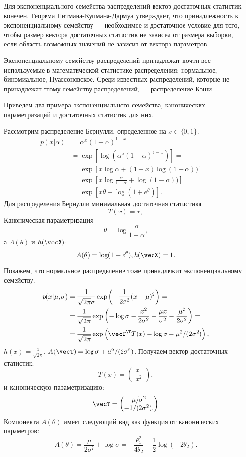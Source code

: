 Для экспоненциального семейства распределений вектор достаточных статистик конечен. Теорема Питмана-Купмана-Дармуа утверждает, что принадлежность к экспоненциальному семейству --- необходимое и достаточное условие для того, чтобы размер вектора достаточных статистик не зависел от размера выборки, если область возможных значений не зависит от вектора параметров.

Экспоненциальному семейству распределений принадлежат почти все используемые в математической статистике распределения: нормальное, биномиальное, Пуассоновское.
Среди известных распределений, которые не принадлежат этому семейству распределений, --- распределение Коши.

Приведем два примера экспоненциального семейства, канонических параметризаций и достаточных статистик для них.
\begin{example}
Рассмотрим распределение Бернулли, определенное на $x \in \{0, 1\}$.
\begin{align*}
p(x | \alpha) &= \alpha^{x} (1 - \alpha)^{1 - x} = \\
&= \exp \left[\log (\alpha^{x} (1 - \alpha)^{1 - x}) \right] = \\
&= \exp \left[x \log \alpha + (1 - x) \log (1 - \alpha)) \right] = \\
&= \exp \left[x \log \frac{\alpha}{1 - \alpha} + \log (1 - \alpha)) \right] = \\
&= \exp \left[x \theta - \log (1 + e^{\theta})\right].
\end{align*}
Для распределения Бернулли минимальная достаточная статистика
\[
T(x) = x, 
\]
Каноническая параметризация 
\[
\theta = \log \frac{\alpha}{1 - \alpha}, 
\]
а $A(\theta)$ и $h(\vecX)$:
\[
A(\theta) = \log (1 + e^{\theta}), h(\vecX) = 1.
\]
\end{example}

\begin{example}
Покажем, что нормальное распределение тоже принадлежит экспоненциальному семейству.
\begin{align*}
p(x| \mu, \sigma) &= \frac{1}{\sqrt{2 \pi} \sigma} \exp \left(-\frac{1}{2 \sigma^2} (x - \mu)^2 \right) =\\
     &= \frac{1}{\sqrt{2 \pi}} \exp \left(-\log \sigma - \frac{x^2}{2 \sigma^2} + \frac{\mu x}{\sigma^2} - \frac{\mu^2}{2 \sigma^2} \right) = \\
    &= \frac{1}{\sqrt{2 \pi}} \exp \left( \vecT^\T T(x) - \log \sigma - \mu^2 / (2 \sigma^2) \right),
\end{align*}
$h(x) = \frac{1}{\sqrt{2 \pi}}$, $A(\vecT) = \log \sigma + \mu^2 / (2 \sigma^2)$.
Получаем вектор достаточных статистик:
\[
T(x) = \begin{pmatrix}
x \\
x^2 
\end{pmatrix},
\]
и каноническую параметризацию:
\[
\vecT = \begin{pmatrix}
\mu / \sigma^2 \\
-1 / (2 \sigma^2).
\end{pmatrix}
\]
Компонента $A(\theta)$ имеет следующий вид как функция от канонических параметров:
\[
A(\theta) = \frac{\mu}{2 \sigma^2} + \log \sigma = - \frac{\theta_1^2}{4 \theta_2} - \frac12 \log (-2\theta_2).
\]
\end{example}

